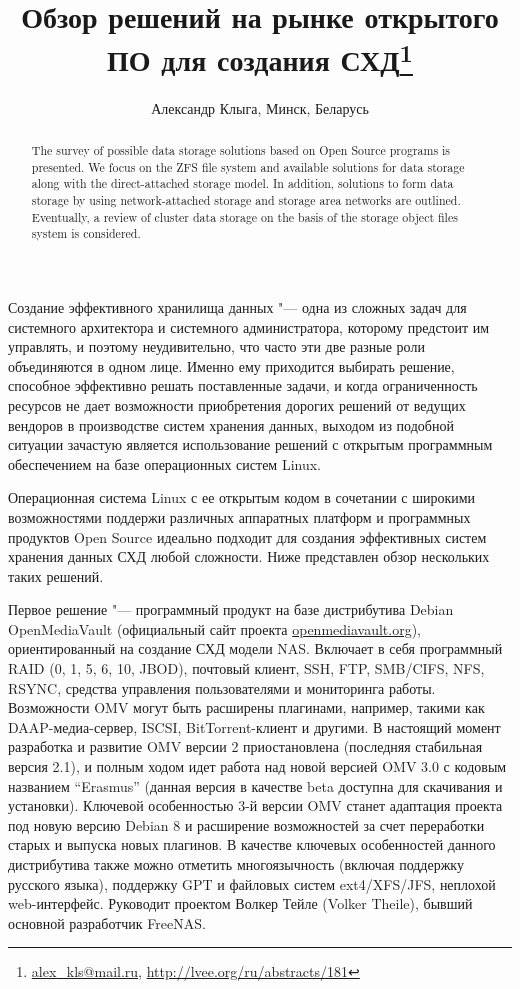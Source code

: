 \documentclass[10pt, a5paper]{article}
\begin{document}
\title{Обзор решений на рынке открытого ПО для создания СХД\footnote{\url{alex_kls@mail.ru}, \url{http://lvee.org/ru/abstracts/181}}}
\author{Александр Клыга, Минск, Беларусь}
\maketitle
\begin{abstract}
The survey of possible data storage solutions based on Open Source programs is presented. We focus on the ZFS file system and available solutions for data storage along with the direct-attached storage model. In addition, solutions to form data stora\-ge by using network-attached storage and storage area networks are outlined. Eventually, a review of  cluster data storage on the basis of the storage object files system is considered.
\end{abstract}
Создание эффективного хранилища данных "--- одна из сложных задач для системного архитектора и системного администратора, которому предстоит им управлять, и поэтому неудивительно, что  часто эти две разные роли объединяются в одном лице. Именно ему приходится выбирать решение, способное эффективно решать поставленные задачи, и когда ограниченность ресурсов не дает возможности приобретения дорогих решений от ведущих вендоров в производстве систем хранения данных, выходом из подобной ситуации зачастую является использование решений с открытым программным обеспечением на базе операционных систем Linux.

Операционная система Linux с ее открытым кодом в сочетании с широкими возможностями поддержи различных аппаратных платформ и программных продуктов Open Source идеально подходит для создания эффективных систем хранения данных СХД любой сложности. Ниже представлен обзор нескольких таких решений.

Первое решение "--- программный продукт на базе дистрибутива Debian OpenMediaVault (официальный сайт проекта \linebreak\url{openmediavault.org}), ориентированный на создание СХД модели NAS. Включает в себя программный RAID (0, 1, 5, 6, 10, JBOD), почтовый клиент, SSH, FTP, SMB/CIFS, NFS, RSYNC, средства управления пользователями и  мониторинга работы. Возможности OMV могут быть расширены плагинами, например, такими как DAAP-медиа-сервер, ISCSI, BitTorrent-клиент и другими. В настоящий момент разработка и развитие OMV версии 2 приостановлена (последняя стабильная версия 2.1), и  полным ходом идет  работа над новой версией OMV 3.0 с кодовым названием ``Erasmus'' (данная версия в качестве beta доступна для скачивания и установки). Ключевой особенностью 3-й версии OMV станет адаптация проекта под новую версию Debian 8 и расширение возможностей за счет переработки старых и выпуска новых плагинов. В качестве ключевых особенностей данного дистрибутива также можно отметить многоязычность (включая поддержку русского языка), поддержку GPT и файловых систем ext4/XFS/JFS, неплохой web-интерфейс. Руководит проектом Волкер Тейле (Volker Theile), бывший основной разработчик FreeNAS.
\end{document}
